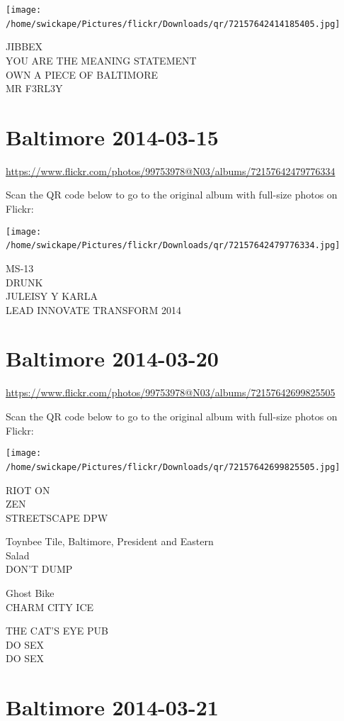 \documentclass[10pt,letterpaper]{article}
\begin{document}
\texttt{[image: /home/swickape/Pictures/flickr/Downloads/qr/72157642414185405.jpg]}
\

JIBBEX\\
YOU ARE THE MEANING STATEMENT\\
OWN A PIECE OF BALTIMORE\\
MR F3RL3Y
\

\section*{Baltimore 2014-03-15}

\url{https://www.flickr.com/photos/99753978@N03/albums/72157642479776334}

Scan the QR code below to go to the original album with full-size photos on Flickr:

\texttt{[image: /home/swickape/Pictures/flickr/Downloads/qr/72157642479776334.jpg]}
\

MS{-}13\\
DRUNK\\
JULEISY Y KARLA\\
LEAD INNOVATE TRANSFORM 2014
\

\section*{Baltimore 2014-03-20}

\url{https://www.flickr.com/photos/99753978@N03/albums/72157642699825505}

Scan the QR code below to go to the original album with full-size photos on Flickr:

\texttt{[image: /home/swickape/Pictures/flickr/Downloads/qr/72157642699825505.jpg]}
\

RIOT ON\\
ZEN\\
STREETSCAPE DPW

Toynbee Tile, Baltimore, President and Eastern\\
Salad\\
DON'T DUMP

Ghost Bike\\
CHARM CITY ICE

THE CAT'S EYE PUB\\
DO SEX\\
DO SEX
\

\section*{Baltimore 2014-03-21}
\end{document}
